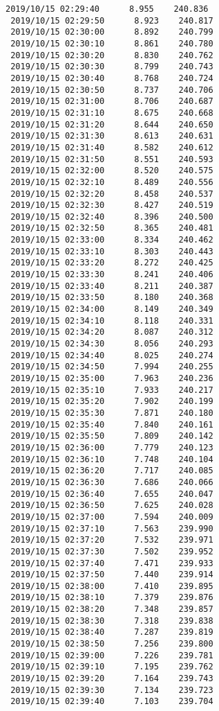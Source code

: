 \documentclass[11pt]{article}
\begin{document}
\begin{Verbatim}[commandchars=\\\{\}]
 2019/10/15 02:29:40      8.955    240.836
 2019/10/15 02:29:50      8.923    240.817
 2019/10/15 02:30:00      8.892    240.799
 2019/10/15 02:30:10      8.861    240.780
 2019/10/15 02:30:20      8.830    240.762
 2019/10/15 02:30:30      8.799    240.743
 2019/10/15 02:30:40      8.768    240.724
 2019/10/15 02:30:50      8.737    240.706
 2019/10/15 02:31:00      8.706    240.687
 2019/10/15 02:31:10      8.675    240.668
 2019/10/15 02:31:20      8.644    240.650
 2019/10/15 02:31:30      8.613    240.631
 2019/10/15 02:31:40      8.582    240.612
 2019/10/15 02:31:50      8.551    240.593
 2019/10/15 02:32:00      8.520    240.575
 2019/10/15 02:32:10      8.489    240.556
 2019/10/15 02:32:20      8.458    240.537
 2019/10/15 02:32:30      8.427    240.519
 2019/10/15 02:32:40      8.396    240.500
 2019/10/15 02:32:50      8.365    240.481
 2019/10/15 02:33:00      8.334    240.462
 2019/10/15 02:33:10      8.303    240.443
 2019/10/15 02:33:20      8.272    240.425
 2019/10/15 02:33:30      8.241    240.406
 2019/10/15 02:33:40      8.211    240.387
 2019/10/15 02:33:50      8.180    240.368
 2019/10/15 02:34:00      8.149    240.349
 2019/10/15 02:34:10      8.118    240.331
 2019/10/15 02:34:20      8.087    240.312
 2019/10/15 02:34:30      8.056    240.293
 2019/10/15 02:34:40      8.025    240.274
 2019/10/15 02:34:50      7.994    240.255
 2019/10/15 02:35:00      7.963    240.236
 2019/10/15 02:35:10      7.933    240.217
 2019/10/15 02:35:20      7.902    240.199
 2019/10/15 02:35:30      7.871    240.180
 2019/10/15 02:35:40      7.840    240.161
 2019/10/15 02:35:50      7.809    240.142
 2019/10/15 02:36:00      7.779    240.123
 2019/10/15 02:36:10      7.748    240.104
 2019/10/15 02:36:20      7.717    240.085
 2019/10/15 02:36:30      7.686    240.066
 2019/10/15 02:36:40      7.655    240.047
 2019/10/15 02:36:50      7.625    240.028
 2019/10/15 02:37:00      7.594    240.009
 2019/10/15 02:37:10      7.563    239.990
 2019/10/15 02:37:20      7.532    239.971
 2019/10/15 02:37:30      7.502    239.952
 2019/10/15 02:37:40      7.471    239.933
 2019/10/15 02:37:50      7.440    239.914
 2019/10/15 02:38:00      7.410    239.895
 2019/10/15 02:38:10      7.379    239.876
 2019/10/15 02:38:20      7.348    239.857
 2019/10/15 02:38:30      7.318    239.838
 2019/10/15 02:38:40      7.287    239.819
 2019/10/15 02:38:50      7.256    239.800
 2019/10/15 02:39:00      7.226    239.781
 2019/10/15 02:39:10      7.195    239.762
 2019/10/15 02:39:20      7.164    239.743
 2019/10/15 02:39:30      7.134    239.723
 2019/10/15 02:39:40      7.103    239.704

\end{Verbatim}
\end{document}
